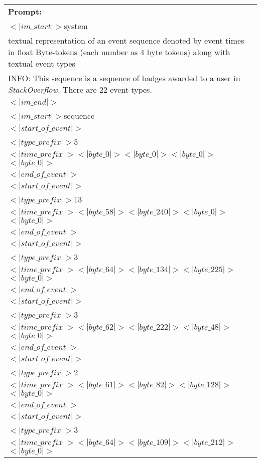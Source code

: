 \begin{table}[h]
\small
\begin{tabular}{|p{}|}
\hline
\vspace{0.1cm}
\textbf{Prompt:} \\
$<|im\_start|>$system \\
textual representation of an event sequence denoted by event times in float Byte-tokens (each number as 4 byte tokens) along with textual event types \\
INFO: This sequence is a sequence of badges awarded to a user in \textit{StackOverflow}. There are 22 event types. \\
$<|im\_end|>$ \\
$<|im\_start|>$sequence \\
$<|start\_of\_event|>$ \\
$<|type\_prefix|>$5 \\
$<|time\_prefix|>$$<|byte\_0|>$$<|byte\_0|>$$<|byte\_0|>$$<|byte\_0|>$ \\
$<|end\_of\_event|>$ \\
$<|start\_of\_event|>$ \\
$<|type\_prefix|>$13 \\
$<|time\_prefix|>$$<|byte\_58|>$$<|byte\_240|>$$<|byte\_0|>$$<|byte\_0|>$ \\
$<|end\_of\_event|>$ \\
$<|start\_of\_event|>$ \\
$<|type\_prefix|>$3 \\
$<|time\_prefix|>$$<|byte\_64|>$$<|byte\_134|>$$<|byte\_225|>$$<|byte\_0|>$ \\
$<|end\_of\_event|>$ \\
$<|start\_of\_event|>$ \\
$<|type\_prefix|>$3 \\
$<|time\_prefix|>$$<|byte\_62|>$$<|byte\_222|>$$<|byte\_48|>$$<|byte\_0|>$ \\
$<|end\_of\_event|>$ \\
$<|start\_of\_event|>$ \\
$<|type\_prefix|>$2 \\
$<|time\_prefix|>$$<|byte\_61|>$$<|byte\_82|>$$<|byte\_128|>$$<|byte\_0|>$ \\
$<|end\_of\_event|>$ \\
$<|start\_of\_event|>$ \\
$<|type\_prefix|>$3 \\
$<|time\_prefix|>$$<|byte\_64|>$$<|byte\_109|>$$<|byte\_212|>$$<|byte\_0|>$ \\

\end{tabular}
\end{table}
